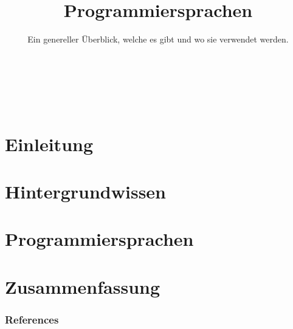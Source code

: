 


\title{Programmiersprachen}
\subtitle{Ein genereller Überblick, welche es gibt und wo sie verwendet werden.}




\backgroundTitle
\begin{frame}
    \thispagestyle{empty}
    \begin{columns}
        \column{0.6\paperwidth}
        \color{hhuBlau}
        \LARGE \inserttitle\\[\baselineskip]
        \large \insertauthor
    \end{columns}
\end{frame}
\backgroundNormal

\section{Einleitung}



\section{Hintergrundwissen}





\section{Programmiersprachen}



\section{Zusammenfassung}




\begin{frame}[allowframebreaks]
    \frametitle{References}
    
\end{frame}




